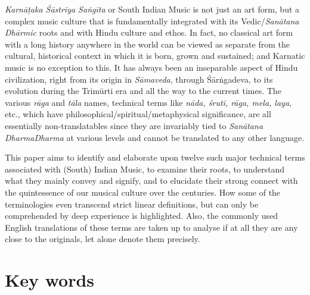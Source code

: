 \textit{Karnāṭaka Śāstrīya Saṅgīta} or South Indian Music is not just an art form, but a complex music culture that is fundamentally integrated with its Vedic/\textit{Sanātana Dhārmic} roots and with Hindu culture and ethos. In fact, no classical art form with a long history anywhere in the world can be viewed as separate from the cultural, historical context in which it is born, grown and sustained; and Karnatic music is no exception to this. It has always been an inseparable aspect of Hindu civilization, right from its origin in \textit{Sāmaveda}, through Śārṅgadeva, to its evolution during the Trimūrti era and all the way to the current times. The various \textit{rāga} and \textit{tāla} names, technical terms like \textit{nāda, śruti, rāga, mela, laya}, etc., which have philosophical/spiritual/metaphysical significance, are all essentially non-translatables since they are invariably tied to \textit{Sanātana Dharma}\textit{Dharma} at various levels and cannot be translated to any other language.

This paper aims to identify and elaborate upon twelve such major technical terms associated with (South) Indian Music, to examine their roots, to understand what they mainly convey and signify, and to elucidate their strong connect with the quintessence of our musical culture over the centuries. How some of the terminologies even transcend strict linear definitions, but can only be comprehended by deep experience is highlighted. Also, the commonly used English translations of these terms are taken up to analyse if at all they are any close to the originals, let alone denote them precisely.

\vspace{-.2cm}

\section*{Key words}

